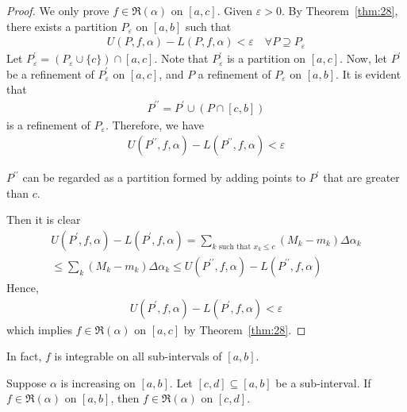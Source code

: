 \documentclass[thmcnt=section, 12pt]{my-elegantbook}
\begin{document}
\begin{proof}
    We only prove $f \in \mathfrak{R}(\alpha)$ on $[a, c]$. Given $\varepsilon > 0$. By Theorem~\ref{thm:28}, there exists a partition $P_\varepsilon$ on $[a, b]$ such that 
    \begin{align*}
        U(P,f,\alpha) - L(P,f,\alpha) < \varepsilon
        \quad \forall P \supseteq P_\varepsilon
    \end{align*}
    Let $P_\varepsilon^\prime = (P_\varepsilon \cup \{ c \}) \cap [a, c]$. Note that $P_\varepsilon^\prime$ is a partition on $[a, c]$. Now, let $P^\prime$ be a refinement of $ P_\varepsilon^\prime$ on $[a, c]$, and $P$ a refinement of $P_\varepsilon$ on $[a, b]$. It is evident that 
    \begin{align*}
        P^{\prime\prime} = P^\prime \cup (P \cap [c, b])
    \end{align*} 
    is a refinement of $P_\varepsilon$. Therefore, we have 
    \begin{align*}
        U(P^{\prime\prime},f,\alpha) - L(P^{\prime\prime},f,\alpha) < \varepsilon
    \end{align*}
    \begin{note}
        $P^{\prime\prime}$ can be regarded as a partition formed by adding points to $P^\prime$ that are greater than $c$.
    \end{note}
    Then it is clear 
    \begin{multline*}
        U(P^{\prime},f,\alpha) - L(P^{\prime},f,\alpha)
        = \sum_{k \text{ such that } x_k \leq c} (M_k - m_k) \Delta \alpha_k \\
        \leq \sum_{k} (M_k - m_k) \Delta \alpha_k
        \leq U(P^{\prime\prime},f,\alpha) - L(P^{\prime\prime},f,\alpha)
    \end{multline*}
    Hence,
    \begin{align*}
        U(P^{\prime},f,\alpha) - L(P^{\prime},f,\alpha) < \varepsilon
    \end{align*}
    which implies $f \in \mathfrak{R}(\alpha)$ on $[a, c]$ by Theorem~\ref{thm:28}.
\end{proof}

In fact, $f$ is integrable on all sub-intervals of $[a, b]$.


\begin{theorem} \label{thm:40}
    Suppose $\alpha$ is increasing on $[a, b]$. Let $[c, d] \subseteq [a, b]$ be a sub-interval. If $f \in \mathfrak{R}(\alpha)$ on $[a, b]$, then $f \in \mathfrak{R}(\alpha)$ on $[c, d]$.
\end{theorem}
\end{document}
